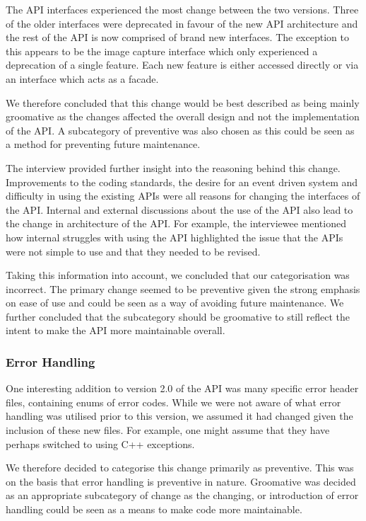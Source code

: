 \documentclass{sig-alternate}
\begin{document}
The API interfaces experienced the most change between the two versions. Three of the older interfaces were deprecated in favour of the new API architecture and the rest of the API is now comprised of brand new interfaces. The exception to this appears to be the image capture interface which only experienced a deprecation of a single feature. Each new feature is either accessed directly or via an interface which acts as a facade. 

We therefore concluded that this change would be best described as being mainly groomative as the changes affected the overall design and not the implementation of the API. A subcategory of preventive was also chosen as this could be seen as a method for preventing future maintenance. 

The interview provided further insight into the reasoning behind this change. Improvements to the coding standards, the desire for an event driven system and difficulty in using the existing APIs were all reasons for changing the interfaces of the API. Internal and external discussions about the use of the API also lead to the change in architecture of the API. For example, the interviewee mentioned how internal struggles with using the API highlighted the issue that the APIs were not simple to use and that they needed to be revised.

Taking this information into account, we concluded that our categorisation was incorrect. The primary change seemed to be preventive given the strong emphasis on ease of use and could be seen as a way of avoiding future maintenance. We further concluded that the subcategory should be groomative to still reflect the intent to make the API more maintainable overall.


\subsubsection{Error Handling}

One interesting addition to version 2.0 of the API was many specific error header files, containing enums of error codes. While we were not aware of what error handling was utilised prior to this version, we assumed it had changed given the inclusion of these new files. For example, one might assume that they have perhaps switched to using C++ exceptions.

We therefore decided to categorise this change primarily as preventive. This was on the basis that error handling is preventive in nature. Groomative was decided as an appropriate subcategory of change as the changing, or introduction of error handling could be seen as a means to make code more maintainable. 
\end{document}
